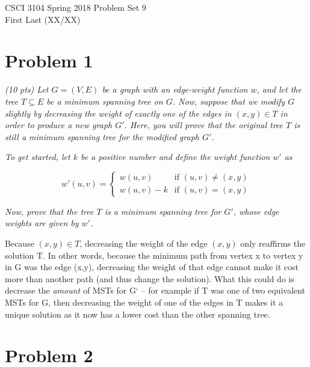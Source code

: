 \documentclass[12pt]{article} \setlength{\oddsidemargin}{0in}
\begin{document}
\noindent CSCI 3104 Spring 2018 \hfill Problem Set 9\\
First Last (XX/XX)

\graphicspath{ {images/} }

\hrulefill

{\selectfont}

\section*{Problem 1}

\textit{(10 pts) Let $G = (V, E)$ be a graph with an edge-weight function $w$, and let the tree
$T \subseteq E$ be a minimum spanning tree on $G$. Now, suppose that we modify $G$ slightly by
decreasing the weight of exactly one of the edges in $(x, y) \in T$ in order to produce a
new graph $G'$. Here, you will prove that the original tree $T$ is still a minimum spanning
tree for the modified graph $G'$.}

\textit{To get started, let $k$ be a positive number and define the weight function $w'$ as}

$$
w'(u,v) =
  \begin{cases}
    w(u,v) & \text{if $(u,v) \ne (x,y)$} \\
    w(u,v)-k & \text{if $(u,v) = (x,y)$}
  \end{cases}
  $$

\textit{Now, prove that the tree $T$ is a minimum spanning tree for $G'$, whose edge weights are
given by $w'$.}

Because $(x,y) \in T$, decreasing the weight of the edge $(x,y)$ only reaffirms the solution T. In other words, because the minimum path from vertex x to vertex y in G was the edge (x,y), decreasing the weight of that edge cannot make it cost more than another path (and thus change the solution). What this could do is decrease the \textit{amount} of MSTs for G` -- for example if T was one of two equivalent MSTs for G, then decreasing the weight of one of the edges in T makes it a unique solution as it now has a lower cost than the other spanning tree. 

\newpage

\section*{Problem 2}
\end{document}
